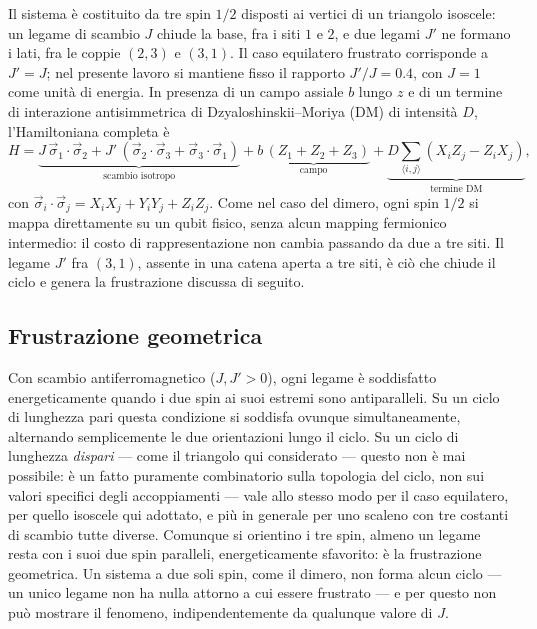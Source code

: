 \documentclass[11pt,a4paper]{article}
\begin{document}
Il sistema è costituito da tre spin $1/2$ disposti ai vertici di un
triangolo isoscele: un legame di scambio $J$ chiude la base, fra i siti
$1$ e $2$, e due legami $J'$ ne formano i lati, fra le coppie $(2,3)$ e
$(3,1)$. Il caso equilatero frustrato corrisponde a $J'=J$; nel presente
lavoro si mantiene fisso il rapporto $J'/J=0.4$, con $J=1$ come unità di
energia. In presenza di un campo assiale $b$ lungo $z$ e di un termine di
interazione antisimmetrica di Dzyaloshinskii--Moriya (DM) di intensità
$D$, l'Hamiltoniana completa è
\begin{equation}
H = \underbrace{J\,\vec\sigma_1\!\cdot\!\vec\sigma_2 +
J'\,(\vec\sigma_2\!\cdot\!\vec\sigma_3+\vec\sigma_3\!\cdot\!\vec\sigma_1)}_{\text{scambio isotropo}}
+ \underbrace{b\,(Z_1+Z_2+Z_3)}_{\text{campo}}
+ \underbrace{D\sum_{\langle i,j\rangle} (X_iZ_j-Z_iX_j)}_{\text{termine DM}},
\label{eq:H}
\end{equation}
con $\vec\sigma_i\cdot\vec\sigma_j=X_iX_j+Y_iY_j+Z_iZ_j$. Come nel caso del
dimero, ogni spin $1/2$ si mappa direttamente su un qubit fisico, senza
alcun mapping fermionico intermedio: il costo di rappresentazione non
cambia passando da due a tre siti. Il legame $J'$ fra $(3,1)$, assente in
una catena aperta a tre siti, è ciò che chiude il ciclo e genera la
frustrazione discussa di seguito.

\subsection{Frustrazione geometrica}

Con scambio antiferromagnetico ($J,J'>0$), ogni legame è soddisfatto
energeticamente quando i due spin ai suoi estremi sono antiparalleli. Su
un ciclo di lunghezza pari questa condizione si soddisfa ovunque
simultaneamente, alternando semplicemente le due orientazioni lungo il
ciclo. Su un ciclo di lunghezza \emph{dispari} --- come il triangolo qui
considerato --- questo non è mai possibile: è un fatto puramente
combinatorio sulla topologia del ciclo, non sui valori specifici degli
accoppiamenti --- vale allo stesso modo per il caso equilatero, per
quello isoscele qui adottato, e più in generale per uno scaleno con tre
costanti di scambio tutte diverse. Comunque si orientino i tre spin,
almeno un legame resta con i suoi due spin paralleli, energeticamente
sfavorito: è la frustrazione geometrica. Un sistema a due soli spin, come
il dimero, non forma alcun ciclo --- un unico legame non ha nulla attorno
a cui essere frustrato --- e per questo non può mostrare il fenomeno,
indipendentemente da qualunque valore di $J$.
\end{document}
